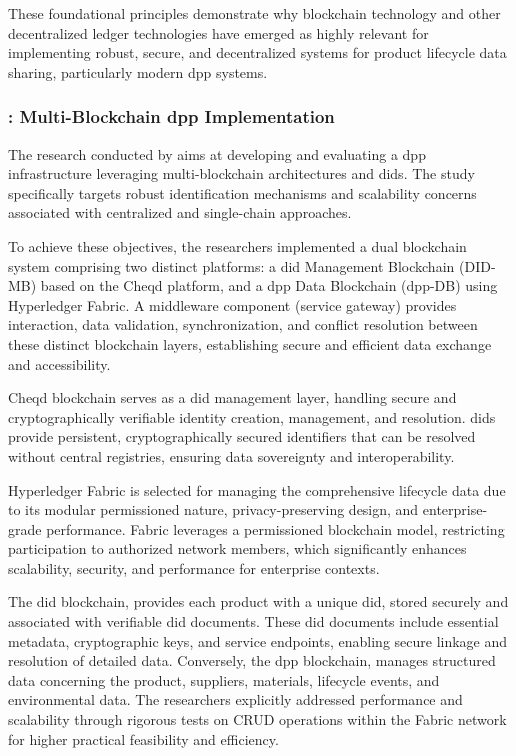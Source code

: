 These foundational principles demonstrate why blockchain technology and other decentralized ledger technologies have emerged as highly relevant for implementing robust, secure, and decentralized systems for product lifecycle data sharing, particularly modern \ac{dpp} systems. \autocite{Zheng.2017}

\subsubsection*{\textcite{Hulea.2024}: Multi-Blockchain \ac{dpp} Implementation}
The research conducted by \textcite{Hulea.2024} aims at developing and evaluating a \ac{dpp} infrastructure leveraging multi-blockchain architectures and \acrlong{did}s. The study specifically targets robust identification mechanisms and scalability concerns associated with centralized and single-chain approaches.

To achieve these objectives, the researchers implemented a dual blockchain system comprising two distinct platforms: a \ac{did} Management Blockchain (DID-MB) based on the Cheqd platform, and a \ac{dpp} Data Blockchain (\ac{dpp}-DB) using Hyperledger Fabric. A middleware component (service gateway) provides interaction, data validation, synchronization, and conflict resolution between these distinct blockchain layers, establishing secure and efficient data exchange and accessibility. \autocite{Hulea.2024}

Cheqd blockchain serves as a \ac{did} management layer, handling secure and cryptographically verifiable identity creation, management, and resolution. \acrlong{did}s provide persistent, cryptographically secured identifiers that can be resolved without central registries, ensuring data sovereignty and interoperability. \autocite{WorldWideWebConsortium.2022}

Hyperledger Fabric is selected for managing the comprehensive lifecycle data due to its modular permissioned nature, privacy-preserving design, and enterprise-grade performance. Fabric leverages a permissioned blockchain model, restricting participation to authorized network members, which significantly enhances scalability, security, and performance for enterprise contexts. \autocite{Androulaki.2018}

The \ac{did} blockchain, provides each product with a unique \ac{did}, stored securely and associated with verifiable \ac{did} documents. These \ac{did} documents include essential metadata, cryptographic keys, and service endpoints, enabling secure linkage and resolution of detailed data. Conversely, the \ac{dpp} blockchain, manages structured data concerning the product, suppliers, materials, lifecycle events, and environmental data. The researchers explicitly addressed performance and scalability through rigorous tests on CRUD operations within the Fabric network for higher practical feasibility and efficiency. \autocite{Hulea.2024}

